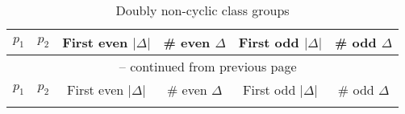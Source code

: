 \documentclass{mcom-l}
\theoremstyle{definition}
\begin{document}
\begin{longtable}[c]{| c | c || r | r | r | r |}
\caption{Doubly non-cyclic class groups\label{tab:NC_mult_2}}\\

\hline
$p_1$	& $p_2$	& \multicolumn{1}{c|}{First even $|\Delta|$}	& \multicolumn{1}{c|}{\# even $\Delta$}	& \multicolumn{1}{c|}{First odd $|\Delta|$}	& \multicolumn{1}{c|}{\# odd $\Delta$}\\
\hline
\hline
\endfirsthead

\multicolumn{6}{c}{\normalsize{{\tablename~\thetable{}} -- continued from previous page}} \\
\hline
$p_1$	& $p_2$	& \multicolumn{1}{c|}{First even $|\Delta|$}	& \multicolumn{1}{c|}{\# even $\Delta$}	& \multicolumn{1}{c|}{First odd $|\Delta|$}	& \multicolumn{1}{c|}{\# odd $\Delta$}\\
\hline
\hline
\endhead

\hline
\endfoot

\hline
\endlastfoot


\end{longtable}
\end{document}
